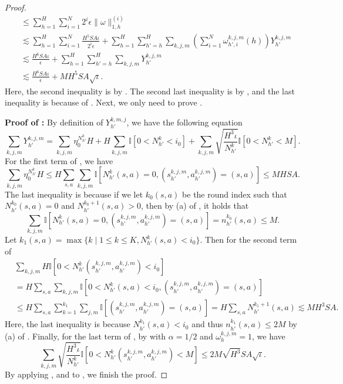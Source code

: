 \documentclass{article}
\begin{document}
\begin{proof}
\begin{align*}
    &\leq \sum_{h=1}^H\sum_{i = 1}^N 2^i\epsilon\|\omega\|_{1,h}^{(i)} \nonumber\\
    &\lesssim \sum_{h=1}^H\sum_{i = 1}^N  \frac{H^5SA\iota}{2^i\epsilon} + \sum_{h=1}^H\sum_{h' = h}^{H}\sum_{k,j,m} \left(\sum_{i = 1}^N\omega_{h',i}^{k,j,m}(h)\right)Y_{h'}^{k,j,m} \\
    &\lesssim \frac{H^6 S A \iota}{\epsilon} +  \sum_{h=1}^H\sum_{h' = h}^{H}\sum_{k,j,m}Y_{h'}^{k,j,m} \\
    &\lesssim \frac{H^6 S A \iota}{\epsilon}  + MH^5SA\sqrt{\iota}.
\end{align*}
Here, the second inequality is by . The second last inequality is by , and the last inequality is because of . Next, we only need to prove .

\textbf{Proof of :} By definition of $Y_{h'}^{k,m,j}$, we have the following equation
\begin{equation}
    \label{upperybegin}
    \sum_{k,j,m}Y_{h'}^{k,j,m} = \sum_{k,j,m}\eta_0^{N_{h'}^k}H+ H\sum_{k,j,m}\mathbb{I}\left[0<N_{h'}^k <i_0 \right]+\sum_{k,j,m}\sqrt{\frac{H^3\iota}{N_{h'}^k}}\mathbb{I}\left[ 0<N_{h'}^k< M\right].
\end{equation}
For the first term of , we have
\begin{equation}
    \label{y1}
    \sum_{k,j,m}\eta_0^{N_{h'}^k}H \leq H\sum_{s,a}\sum_{k,j,m} \mathbb{I}[N_{h'}^k(s,a) = 0, (s_{h'}^{k,j,m}, a_{h'}^{k,j,m}) = (s,a)] \leq MHSA.
\end{equation}
The last inequality is because if we let $k_0(s,a)$ be the round index such that $N_{h'}^{k_0}(s,a) = 0$ and $N_{h'}^{k_0+1}(s,a) > 0$, then by (a) of , it holds that 
$$\sum_{k,j,m} \mathbb{I}[N_{h'}^k(s,a) = 0, (s_{h'}^{k,j,m}, a_{h'}^{k,j,m}) = (s,a)]  = n_{h'}^{k_0}(s,a)\leq M.$$
Let  $k_1(s,a) = \max \{k \mid 1 \leq k\leq K, N_{h'}^k(s,a) <i_0\}$. Then for the second term of 
\begin{align}
\label{y2}
    &\sum_{k,j,m} H\mathbb{I}\left[0<N_{h'}^k(s_{{h'}}^{k,j,m},a_{{h'}}^{k,j,m}) <i_0 \right] \nonumber\\
    &= H\sum_{s,a}\sum_{k,j,m} \mathbb{I}\left[0<N_{h'}^k(s,a) <i_0, (s_{{h'}}^{k,j,m},a_{{h'}}^{k,j,m}) = (s,a)\right] \nonumber\\
    &\leq H\sum_{s,a}\sum_{k=1}^{k_1}\sum_{j,m}\mathbb{I}\left[(s_{{h'}}^{k,j,m},a_{{h'}}^{k,j,m}) = (s,a)\right] = H\sum_{s,a} N_{h'}^{k_1+1}(s,a)\lesssim MH^3SA.
\end{align}
Here, the last inequality is because $N_{h'}^{k_1}(s,a) <i_0$ and thus $n_{h'}^{k_1}(s,a) \leq 2M$ by (a) of . Finally, for the last term of , by  with $\alpha = 1/2$ and $\omega_h^{k,j,m} = 1$, we have
\begin{equation}
    \label{y3}
    \sum_{k,j,m}\sqrt{\frac{H^3\iota}{N_{h'}^k}}\mathbb{I}\left[ 0<N_{h'}^k(s_{{h'}}^{k,j,m},a_{{h'}}^{k,j,m})< M\right] \leq 2M\sqrt{H^3}SA\sqrt{\iota}.
\end{equation}
By applying ,  and  to , we finish the proof.
\end{proof}
\end{document}

